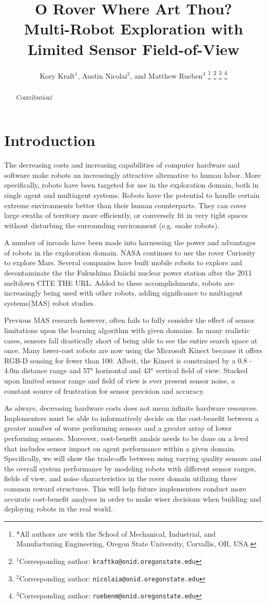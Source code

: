 \documentclass[letterpaper, 10 pt, conference]{ieeeconf}  %
\title{\LARGE \bf 
O Rover Where Art Thou?\\
Multi-Robot Exploration with Limited Sensor Field-of-View
}
\author{Kory Kraft$^{1}$, Austin Nicolai$^{2}$, and Matthew Rueben$^{3}$%
\thanks{*All authors are with the School of Mechanical, Industrial, and Manufacturing Engineering,
         Oregon State University,
         Corvallis, OR, USA. }%
\thanks{$^{1}$Corresponding author: {\tt\small kraftko@onid.oregonstate.edu}}%
\thanks{$^{2}$Corresponding author: {\tt\small nicolaia@onid.oregonstate.edu}}%
\thanks{$^{3}$Corresponding author: {\tt\small ruebenm@onid.oregonstate.edu}}%
}
\begin{document}
\maketitle
\thispagestyle{empty}
\pagestyle{empty}

\begin{abstract}
Contribution!
\end{abstract}


\section{Introduction}
The decreasing costs and increasing capabilities of computer hardware and software make
robots an increasingly attractive alternative to human labor. More specifically, robots have 
been targeted for use in the exploration domain, both in single agent and 
multiagent systems.  Robots have the potential to
handle certain extreme environments better than their human
counterparts.  They can cover large swaths of territory more
efficiently, or conversely fit in very tight spaces without disturbing
the surrounding environment (e.g. snake robots). 

A number of inroads have been made into harnessing the power and
advantages of robots in the exploration domain. NASA continues to use
the rover Curiosity to explore Mars. Several companies have built
mobile robots to explore and decontaminate the the Fukushima Daiichi
nuclear power station after the 2011 meltdown CITE THE URL. Added to these
accomplishments, robots are increasingly being used with other robots, 
adding significance to multiagent systems(MAS) robot studies.

Previous MAS research however, often fails to fully consider the effect of
sensor limitations upon the learning algorithm with given domains. In many realistic cases, 
sensors fall drastically short of being able to see the entire search space at once. Many lower-cost
robots are now using the Microsoft Kinect because it offers RGB-D
sensing for fewer than 100. Albeit, the Kinect is constrained by a 0.8 - 4.0m distance range 
and 57° horizontal and 43° vertical field of view.  
Stacked upon limited sensor range and field of view is ever present sensor noise, a constant
source of frustration for sensor precision and accuracy.

As always, decreasing hardware costs does not mean infinite hardware resources.
Implementers must be able to informatively decide on the cost-benefit 
between a greater number of worse performing sensors and a greater array of lower performing 
sensors. Moreover, cost-benefit analsis needs to be done on a level that includes sensor impact on
 agent performance within a given domain. Specifically, we will show the trade-offs between using varying 
 quality sensors and the overall system performance by modeling robots with different sensor ranges, fields of view, 
 and noise characteristics in the rover domain utilizing three common reward structures. 
 This will help future implementers conduct more accurate cost-benefit analyses in order to make wiser decisions when
building and deploying robots in the real world.
\end{document}
